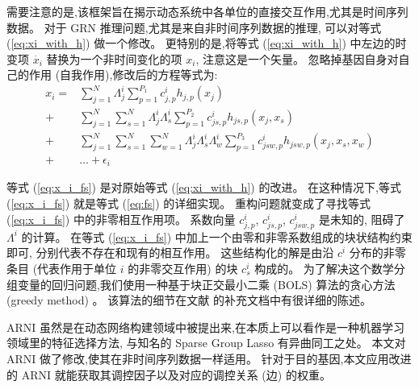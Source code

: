 需要注意的是,该框架旨在揭示动态系统中各单位的直接交互作用,尤其是时间序列数据。
对于 GRN 推理问题,尤其是来自非时间序列数据的推理,
可以对等式 (\ref{eq:xi_with_h}) 做一个修改。
更特别的是,将等式 (\ref{eq:xi_with_h}) 中左边的时变项 $\dot{x_i}$ 替换为一个非时间变化的项 $x_i$, 注意这是一个矢量。
忽略掉基因自身对自己的作用 (自我作用),修改后的方程等式为:
\begin{equation}
\label{eq:x_i_fs}
\begin{split}
   x_i = &\sum_{j=1}^{N} \Lambda^i_{j} \sum_{p=1}^{P_1} c^i_{j,p}h_{j,p}(x_j)\\ 
       + &\sum_{j=1}^{N} \sum_{s=1}^{N}\Lambda^i_{j}\Lambda^i_{s} \sum_{p=1}^{P_2} c^i_{js,p}h_{js,p}(x_j,x_s) \\ 
       + &\sum_{j=1}^{N} \sum_{s=1}^{N} \sum_{w=1}^{N}\Lambda^i_{j}\Lambda^i_{s}\Lambda^i_{w} \sum_{p=1}^{P_3} c^i_{jsw,p}h_{jsw,p}(x_j,x_s,x_w)\\
       +&\ldots + \epsilon_{i}
   \end{split}
\end{equation}

等式 (\ref{eq:x_i_fs}) 是对原始等式 (\ref{eq:xi_with_h}) 的改进。
在这种情况下,等式 (\ref{eq:x_i_fs}) 就是等式 (\ref{eq:fs}) 的详细实现。
重构问题就变成了寻找等式 (\ref{eq:x_i_fs}) 中的非零相互作用项。
系数向量 $c^i_{j,p}$, $c^i_{js,p}$, $c^i_{jsw,p}$ 是未知的,
阻碍了 $\Lambda^i$ 的计算。
在等式 (\ref{eq:x_i_fs}) 中加上一个由零和非零系数组成的块状结构约束即可,
分别代表不存在和现有的相互作用。
这些结构化的解是由沿 $c^i$ 分布的非零条目 (代表作用于单位 $i$ 的非零交互作用) 的块 $c^i_s$ 构成的。
为了解决这个数学分组变量的回归问题,我们使用一种基于块正交最小二乘 (BOLS) 算法的贪心方法 (greedy method) \cite{majumdar2009fast}。
该算法的细节在文献 \cite{casadiego2017model} 的补充文档中有很详细的陈述。

ARNI 虽然是在动态网络构建领域中被提出来,在本质上可以看作是一种机器学习领域里的特征选择方法,
与知名的 Sparse Group Lasso \cite{friedman2010note} 有异曲同工之处。
本文对 ARNI 做了修改,使其在非时间序列数据一样适用。
针对于目的基因,本文应用改进的 ARNI 就能获取其调控因子以及对应的调控关系 (边) 的权重。

